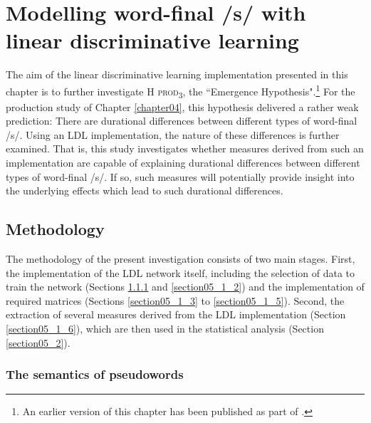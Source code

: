 \chapter{Modelling word-final /s/ with linear discriminative learning}\label{chapter05}

The aim of the linear discriminative learning implementation presented in this chapter is to further investigate \textsc{H prod\textsubscript{3}}, the ``Emergence Hypothesis".\footnote{An earlier version of this chapter has been published as part of \cite{Schmitz2021b}.} For the production study of Chapter \ref{chapter04}, this hypothesis delivered a rather weak prediction: There are durational differences between different types of word-final /s/. Using an LDL implementation, the nature of these differences is further examined. That is, this study investigates whether measures derived from such an implementation are capable of explaining durational differences between different types of word-final /s/. If so, such measures will potentially provide insight into the underlying effects which lead to such durational differences.

\section{Methodology}\label{section05_1}

The methodology of the present investigation consists of two main stages. First, the implementation of the LDL network itself, including the selection of data to train the network (Sections \ref{section05_1_1} and \ref{section05_1_2}) and the implementation of required matrices (Sections \ref{section05_1_3} to \ref{section05_1_5}). Second, the extraction of several measures derived from the LDL implementation (Section \ref{section05_1_6}), which are then used in the statistical analysis (Section \ref{section05_2}).

\subsection{The semantics of pseudowords}\label{section05_1_1}

